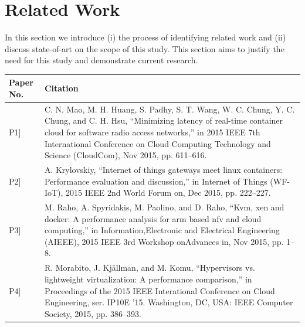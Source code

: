 \chapter{Related Work} \label{section:relatedwork} 
In this section we introduce (i) the process of identifying related work and (ii) discuss state-of-art on the scope of this study. This section aims to justify the need for this study and demonstrate current research. %

\begin{table}[ht]
\renewcommand{\arraystretch}{1.4}
\begin{tabular}{| >{\centering}m{1.3cm} |>{\arraybackslash}m{12.7cm}|}
\hline
\textbf{Paper No.} & \textbf{Citation}\\ \hline
{[}P1{]}  & C. N. Mao, M. H. Huang, S. Padhy, S. T. Wang, W. C. Chung, Y. C. Chung, and C. H. Hsu, “Minimizing latency of real-time container cloud for software radio access networks,” in 2015 IEEE 7th International Conference on Cloud Computing Technology and Science (CloudCom), Nov 2015, pp. 611–616.                                  \\
{[}P2{]}  & A. Krylovskiy, “Internet of things gateways meet linux containers: Performance evaluation and discussion,” in Internet of Things (WF-IoT), 2015 IEEE 2nd World Forum on, Dec 2015, pp. 222–227.                                                                                                                                      \\
{[}P3{]}  & M. Raho, A. Spyridakis, M. Paolino, and D. Raho, “Kvm, xen and docker: A performance analysis for arm based nfv and cloud computing,” in Information,Electronic and Electrical Engineering (AIEEE), 2015 IEEE 3rd Workshop onAdvances in, Nov 2015, pp. 1–8.                                                                         \\
{[}P4{]}  & R. Morabito, J. Kj\"allman, and M. Komu, “Hypervisors vs. lightweight virtualization: A performance comparison,” in Proceedings of the 2015 IEEE Interational Conference on Cloud Engineering, ser. IP10E ’15. Washington, DC, USA: IEEE Computer Society, 2015, pp. 386–393.                                                      \\

\end{tabular}
\end{table}
